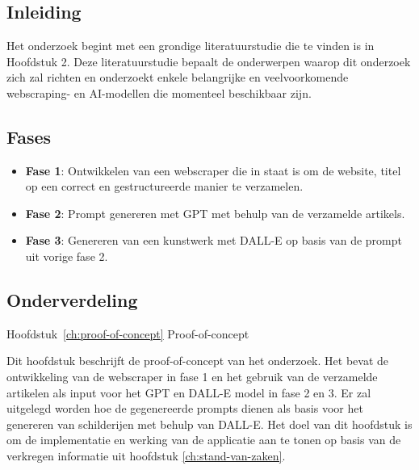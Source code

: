 
\chapter{}%
\label{ch:methodologie}

\section{Inleiding}
Het onderzoek begint met een grondige literatuurstudie die te vinden is in Hoofdstuk 2. Deze literatuurstudie bepaalt de onderwerpen waarop dit onderzoek zich zal richten en onderzoekt enkele belangrijke en veelvoorkomende webscraping- en AI-modellen die momenteel beschikbaar zijn.  \\

\section{Fases}
\begin{itemize}
    \item \textbf{Fase 1}: Ontwikkelen van een webscraper die in staat is om de website, titel op een correct en gestructureerde manier te verzamelen. 
    \item \textbf{Fase 2}: Prompt genereren met GPT met behulp van de verzamelde artikels. 
    \item \textbf{Fase 3}: Genereren van een kunstwerk met DALL-E op basis van de prompt uit vorige fase 2.
\end{itemize} 

\section{Onderverdeling}

Hoofdstuk~\ref{ch:proof-of-concept} Proof-of-concept

Dit hoofdstuk beschrijft de proof-of-concept van het onderzoek. Het bevat de ontwikkeling van de webscraper in fase 1 en het gebruik van de verzamelde artikelen als input voor het GPT en DALL-E model in fase 2 en 3. Er zal uitgelegd worden hoe de gegenereerde prompts dienen als basis voor het genereren van schilderijen met behulp van DALL-E. Het doel van dit hoofdstuk is om de implementatie en werking van de applicatie aan te tonen op basis van de verkregen informatie uit hoofdstuk \ref{ch:stand-van-zaken}.  \\

